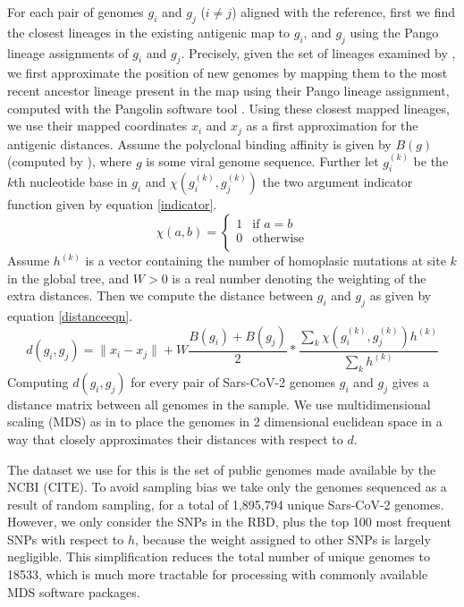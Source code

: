 \documentclass{article}
\begin{document}
For each pair of genomes $g_i$ and $g_j$ ($i\neq j$) aligned with the reference, first we find the closest lineages in the existing antigenic map to $g_i$, and $g_j$ using the Pango lineage assignments of $g_i$ and $g_j$. Precisely, given the set of lineages examined by \cite{wilksMappingSARSCoV2Antigenic2022}, we first approximate the position of new genomes by mapping them to the most recent ancestor lineage present in the map using their Pango lineage assignment, computed with the Pangolin software tool \cite{o2021assignment}. Using these closest mapped lineages, we use their mapped coordinates $x_i$ and $x_j$ as a first approximation for the antigenic distances.
Assume the polyclonal binding affinity is given by $B(g)$ (computed by \cite{greaney2022antibody}), where $g$ is some viral genome sequence. Further let $g_i^{(k)}$ be the $k$th nucleotide base in $g_i$ and $\chi(g_i^{(k)},g_j^{(k)})$ the two argument indicator function given by equation \ref{indicator}.
\begin{equation}
        \chi(a,b) =   \begin{cases}
        1 & \text{if $a = b$} \\
        0 & \text{otherwise} \\
    \end{cases}
    \label{indicator}
\end{equation}
Assume $h^{(k)}$ is a vector containing the number of homoplasic mutations at site $k$ in the global tree, and $W>0$ is a real number denoting the weighting of the extra distances.
Then we compute the distance between $g_i$ and $g_j$ as given by equation \ref{distanceeqn}.
\begin{equation}
    d(g_i,g_j) = \lVert x_i - x_j \rVert + W \frac{B(g_i) + B(g_j)}{2} * \frac{\sum_k \chi\left(g_i^{(k)},g_j^{(k)}\right) h^{(k)}}{\sum_k h^{(k)}}
    \label{distanceeqn}
\end{equation}
Computing $d(g_i, g_j)$ for every pair of Sars-CoV-2 genomes $g_i$ and $g_j$ gives a distance matrix between all genomes in the sample.
We use multidimensional scaling (MDS) as in \cite{wilksMappingSARSCoV2Antigenic2022, lapedesGeometryShapeSpace2001} to place the genomes in 2 dimensional euclidean space in a way that closely approximates their distances with respect to $d$.


The dataset we use for this is the set of public genomes made available by the NCBI (CITE). 
To avoid sampling bias we take only the genomes sequenced as a result of random sampling, for a total of 1,895,794 unique Sars-CoV-2 genomes.
However, we only consider the SNPs in the RBD, plus the top 100 most frequent SNPs with respect to $h$, because the weight assigned to other SNPs is largely negligible. 
This simplification reduces the total number of unique genomes to 18533, which is much more tractable for processing with commonly available MDS software packages.
\end{document}
